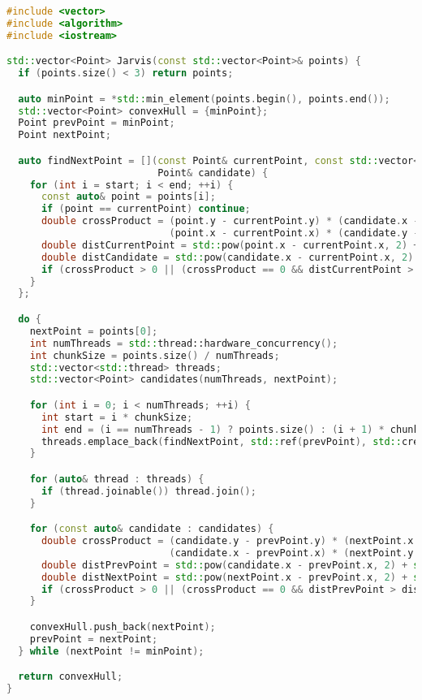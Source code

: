 \documentclass[]{article}
\theoremstyle{remark}
\theoremstyle{definition}
\begin{document}
\begin{lstlisting}[language=C++]
#include <vector>
#include <algorithm>
#include <iostream>

std::vector<Point> Jarvis(const std::vector<Point>& points) {
  if (points.size() < 3) return points;

  auto minPoint = *std::min_element(points.begin(), points.end());
  std::vector<Point> convexHull = {minPoint};
  Point prevPoint = minPoint;
  Point nextPoint;

  auto findNextPoint = [](const Point& currentPoint, const std::vector<Point>& points, int start, int end,
                          Point& candidate) {
    for (int i = start; i < end; ++i) {
      const auto& point = points[i];
      if (point == currentPoint) continue;
      double crossProduct = (point.y - currentPoint.y) * (candidate.x - currentPoint.x) -
                            (point.x - currentPoint.x) * (candidate.y - currentPoint.y);
      double distCurrentPoint = std::pow(point.x - currentPoint.x, 2) + std::pow(point.y - currentPoint.y, 2);
      double distCandidate = std::pow(candidate.x - currentPoint.x, 2) + std::pow(candidate.y - currentPoint.y, 2);
      if (crossProduct > 0 || (crossProduct == 0 && distCurrentPoint > distCandidate)) candidate = point;
    }
  };

  do {
    nextPoint = points[0];
    int numThreads = std::thread::hardware_concurrency();
    int chunkSize = points.size() / numThreads;
    std::vector<std::thread> threads;
    std::vector<Point> candidates(numThreads, nextPoint);

    for (int i = 0; i < numThreads; ++i) {
      int start = i * chunkSize;
      int end = (i == numThreads - 1) ? points.size() : (i + 1) * chunkSize;
      threads.emplace_back(findNextPoint, std::ref(prevPoint), std::cref(points), start, end, std::ref(candidates[i]));
    }

    for (auto& thread : threads) {
      if (thread.joinable()) thread.join();
    }

    for (const auto& candidate : candidates) {
      double crossProduct = (candidate.y - prevPoint.y) * (nextPoint.x - prevPoint.x) -
                            (candidate.x - prevPoint.x) * (nextPoint.y - prevPoint.y);
      double distPrevPoint = std::pow(candidate.x - prevPoint.x, 2) + std::pow(candidate.y - prevPoint.y, 2);
      double distNextPoint = std::pow(nextPoint.x - prevPoint.x, 2) + std::pow(nextPoint.y - prevPoint.y, 2);
      if (crossProduct > 0 || (crossProduct == 0 && distPrevPoint > distNextPoint)) nextPoint = candidate;
    }

    convexHull.push_back(nextPoint);
    prevPoint = nextPoint;
  } while (nextPoint != minPoint);

  return convexHull;
}
\end{lstlisting}
\end{document}
